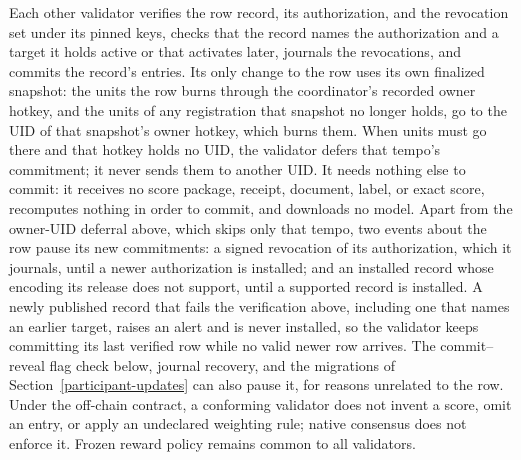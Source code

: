 Each other validator verifies the row record, its authorization, and the
revocation set under its pinned keys, checks that the record names the
authorization and a target it holds active or that activates later, journals
the revocations, and commits the record's entries. Its only change to the row uses its own finalized
snapshot: the units the row burns through the coordinator's recorded owner
hotkey, and the units of any registration that snapshot no longer holds, go to
the UID of that snapshot's owner hotkey, which burns them. When units must go
there and that hotkey holds no UID, the validator defers that tempo's
commitment; it never sends them to another UID. It needs nothing else to commit: it receives no score package, receipt,
document, label, or exact score, recomputes nothing in order to commit, and
downloads no model. Apart from the owner-UID deferral above, which skips only
that tempo, two events about the row pause its new commitments: a signed
revocation of its authorization, which it journals, until a newer authorization
is installed; and an installed record whose encoding its release does not
support, until a supported record is installed. A newly published record that
fails the verification above, including one that names an earlier target,
raises an alert and is never installed, so the validator keeps committing its last verified row while no
valid newer row arrives. The commit--reveal flag check below, journal
recovery, and the migrations of Section~\ref{participant-updates} can also pause
it, for reasons unrelated to the row. Under the off-chain contract, a conforming
validator does not invent a score, omit an entry, or apply an undeclared
weighting rule; native consensus does not enforce it. Frozen reward policy remains
common to all validators.

